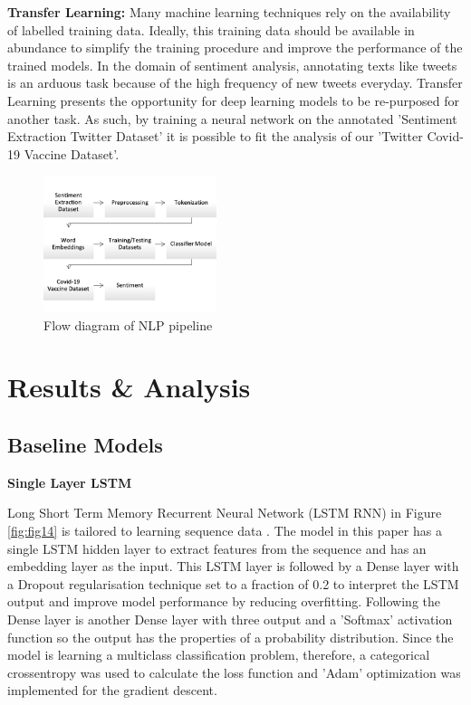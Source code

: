 \documentclass[conference]{IEEEtran}
\begin{document}
\textbf{Transfer Learning:} Many  machine  learning  techniques  rely  on  the  availability of  labelled  training  data.  Ideally,  this  training  data  should be  available  in  abundance  to  simplify  the  training  procedure and  improve  the  performance  of  the  trained  models. In the domain of sentiment analysis, annotating texts like tweets is an arduous task because of the high frequency of new tweets everyday. Transfer Learning presents the opportunity for deep learning models to be re-purposed for another task. As such, by training a neural network on the annotated 'Sentiment Extraction Twitter Dataset' it is possible to fit the analysis of our 'Twitter Covid-19 Vaccine Dataset'. 


\begin{figure}[h]
\centering
\includegraphics[width=0.45\textwidth]{NLPpipeline.png}
\caption{Flow diagram of NLP pipeline}
\label{fig:fig1}
\end{figure} 


\section{Results \& Analysis} \label{sec:results}
\subsection{Baseline Models}

\textbf{Single Layer LSTM}

Long Short Term Memory Recurrent Neural Network (LSTM RNN) in Figure \ref{fig:fig14} is tailored to learning sequence data \cite{huang2015bidirectional}. The model in this paper has a single LSTM hidden layer to extract features from the sequence and has an embedding layer as the input. This LSTM layer is followed by a Dense layer with a Dropout regularisation technique set to a fraction of 0.2 to interpret the LSTM output and improve model performance by reducing overfitting. Following the Dense layer is another Dense layer with three output and a 'Softmax' activation function so the output has the properties of a probability distribution. Since the model is learning a multiclass classification problem, therefore, a categorical crossentropy was used to calculate the loss function and 'Adam' optimization was implemented for the gradient descent. \\
\end{document}
